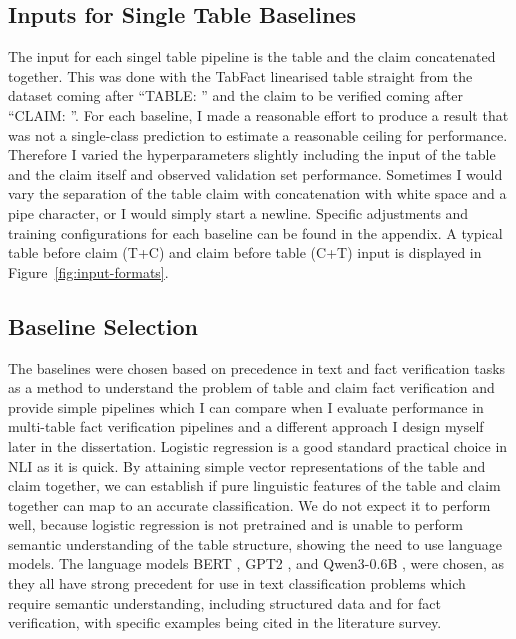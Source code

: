 \subsection{Inputs for Single Table Baselines} 
The input for each singel table pipeline is the table and the claim concatenated together. This was done with the TabFact linearised table straight from the dataset coming after “TABLE: ”  and the claim to be verified coming after “CLAIM: ”. For each baseline, I made a reasonable effort to produce a result that was not a single-class prediction to estimate a reasonable ceiling for performance. Therefore I varied the hyperparameters slightly including the input of the table and the claim itself and observed validation set performance. Sometimes I would vary the separation of the table claim with concatenation with white space and a pipe character, or I would simply start a newline. Specific adjustments and training configurations for each baseline can be found in the appendix. A typical table before claim (T+C) and claim before table (C+T) input is displayed in Figure~\ref{fig:input-formats}.


\subsection{Baseline Selection}
The baselines were chosen based on precedence in text and fact verification tasks as a method to understand the problem of table and claim fact verification and provide simple pipelines which I can compare when I evaluate performance in multi-table fact verification pipelines and a different approach I design myself later in the dissertation. Logistic regression \parencite{cox1958regression} is a good standard practical choice in NLI as it is quick. By attaining simple vector representations of the table and claim together, we can establish if pure linguistic features of the table and claim together can map to an accurate classification. We do not expect it to perform well, because logistic regression is not pretrained and is unable to perform semantic understanding of the table structure, showing the need to use language models. The language models BERT \parencite{devlin2019bert}, GPT2 \parencite{radford2019language}, and Qwen3-0.6B \parencite{yang2025qwen3}, were chosen, as they all have strong precedent for use in text classification problems which require semantic understanding, including structured data and for fact verification, with specific examples being cited in the literature survey. 

